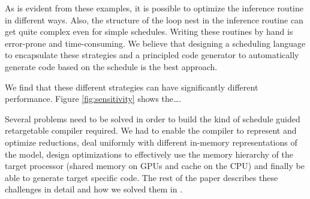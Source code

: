 As is evident from these examples, it is possible to optimize 
the inference routine in different ways. Also, the structure of the loop 
nest in the inference routine can get quite complex even 
for simple schedules. Writing these routines by hand 
is error-prone and time-consuming.  We believe that designing a 
scheduling language to encapsulate these strategies and a principled code 
generator to automatically generate code based on the schedule is the 
best approach. 

We find that these different strategies can have significantly different
performance. Figure \ref{fig:sensitivity} shows the\dots.

Several problems need to be solved in order to build the kind of 
schedule guided retargetable compiler required. We had to enable the
compiler to represent and optimize reductions, deal uniformly with different
in-memory representations of the model, design optimizations to effectively 
use the memory hierarchy of the target processor (shared memory on GPUs and 
cache on the CPU) and finally be able to generate target specific code. 
The rest of the paper describes these challenges in detail and how we
solved them in \Treebeard{}.

